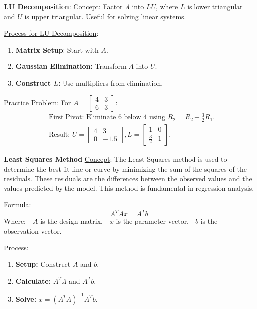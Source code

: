 \documentclass[8pt, a4paper, landscape]{extarticle} %
\begin{document}
\begin{multicols*}{4} %

  \textbf{LU Decomposition}:
  \underline{Concept}: Factor \( A \) into \( LU \), where \( L \) is lower triangular and \( U \) is upper triangular. Useful for solving linear systems.

  \underline{Process for LU Decomposition}:
  \begin{enumerate}
    \item \textbf{Matrix Setup:} Start with \( A \).
    \item \textbf{Gaussian Elimination:} Transform \( A \) into \( U \).
    \item \textbf{Construct \( L \):} Use multipliers from elimination.
  \end{enumerate}

  \underline{Practice Problem}:
  For \( A = \begin{bmatrix} 4 & 3 \\ 6 & 3 \end{bmatrix} \):
  \[
    \begin{aligned}
       & \text{First Pivot: Eliminate 6 below 4 using } R_2 = R_2 - \frac{3}{2} R_1.                                                      \\
       & \text{Result: } U = \begin{bmatrix} 4 & 3 \\ 0 & -1.5 \end{bmatrix}, L = \begin{bmatrix} 1 & 0 \\ \frac{3}{2} & 1 \end{bmatrix}.
    \end{aligned}
  \]


  \textbf{Least Squares Method}
  \underline{Concept}: The Least Squares method is used to determine the best-fit line or curve by minimizing the sum of the squares of the residuals. These residuals are the differences between the observed values and the values predicted by the model. This method is fundamental in regression analysis.

  \underline{Formula:}
  \[ A^T A x = A^T b \]
  Where:
  - \( A \) is the design matrix.
  - \( x \) is the parameter vector.
  - \( b \) is the observation vector.

  \underline{Process:}
  \begin{enumerate}
    \item \textbf{Setup:} Construct \( A \) and \( b \).
    \item \textbf{Calculate:} \( A^T A \) and \( A^T b \).
    \item \textbf{Solve:} \( x = (A^T A)^{-1} A^T b \).
  \end{enumerate}


\end{multicols*}
\end{document}
